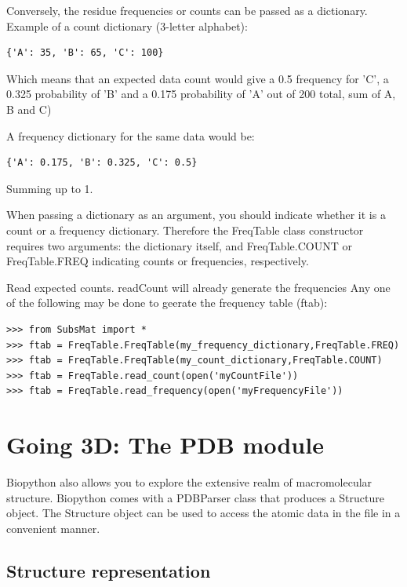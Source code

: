 \documentclass{report}
\begin{document}
\begin{enumerate}
Conversely, the residue frequencies or counts can be passed as a dictionary. 
Example of a count dictionary (3-letter alphabet):

\begin{verbatim}
{'A': 35, 'B': 65, 'C': 100}
\end{verbatim}

Which means that an expected data count would give a 0.5 frequency 
for 'C', a 0.325 probability of 'B' and a 0.175 probability of 'A' 
out of 200 total, sum of A, B and C)
 
 A frequency dictionary for the same data would be:

\begin{verbatim}
{'A': 0.175, 'B': 0.325, 'C': 0.5}
\end{verbatim}

Summing up to 1.

When passing a dictionary as an argument, you should indicate whether it is a count or a frequency dictionary. Therefore the FreqTable class constructor requires two arguments: the dictionary itself, and FreqTable.COUNT or FreqTable.FREQ indicating counts or frequencies, respectively.


Read expected counts. readCount will already generate the frequencies
Any one of the following may be done to geerate the frequency table (ftab):

\begin{verbatim}
>>> from SubsMat import *
>>> ftab = FreqTable.FreqTable(my_frequency_dictionary,FreqTable.FREQ)
>>> ftab = FreqTable.FreqTable(my_count_dictionary,FreqTable.COUNT)
>>> ftab = FreqTable.read_count(open('myCountFile'))
>>> ftab = FreqTable.read_frequency(open('myFrequencyFile'))
\end{verbatim}

\end{enumerate}

\section{Going 3D: The PDB module}

Biopython also allows you to explore the extensive realm of macromolecular structure. 
Biopython comes with a PDBParser class that produces a Structure object. The Structure object 
can be used to access the atomic data in the file in a convenient manner. 

\subsection{Structure representation}
\end{document}

